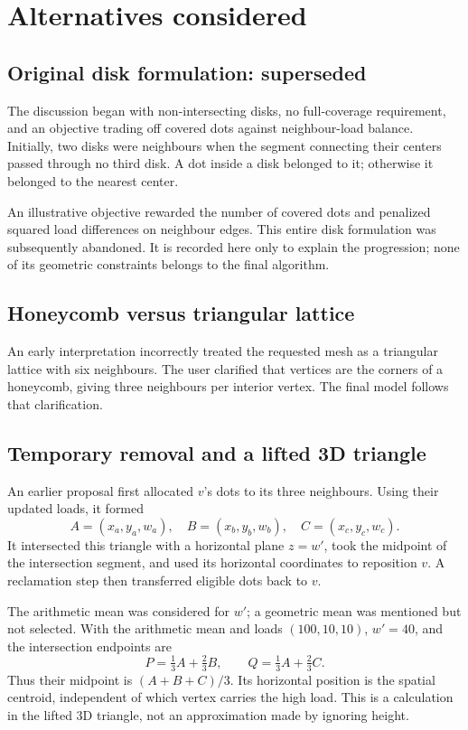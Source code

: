 \documentclass[11pt]{article}
\begin{document}
\section{Alternatives considered}
\subsection{Original disk formulation: superseded}
The discussion began with non-intersecting disks, no full-coverage requirement, and an objective trading off covered dots against neighbour-load balance. Initially, two disks were neighbours when the segment connecting their centers passed through no third disk. A dot inside a disk belonged to it; otherwise it belonged to the nearest center.

An illustrative objective rewarded the number of covered dots and penalized squared load differences on neighbour edges. This entire disk formulation was subsequently abandoned. It is recorded here only to explain the progression; none of its geometric constraints belongs to the final algorithm.

\subsection{Honeycomb versus triangular lattice}
An early interpretation incorrectly treated the requested mesh as a triangular lattice with six neighbours. The user clarified that vertices are the corners of a honeycomb, giving three neighbours per interior vertex. The final model follows that clarification.

\subsection{Temporary removal and a lifted 3D triangle}
An earlier proposal first allocated $v$'s dots to its three neighbours. Using their updated loads, it formed
\[
A=(x_a,y_a,w_a),\quad B=(x_b,y_b,w_b),\quad C=(x_c,y_c,w_c).
\]
It intersected this triangle with a horizontal plane $z=w'$, took the midpoint of the intersection segment, and used its horizontal coordinates to reposition $v$. A reclamation step then transferred eligible dots back to $v$.

The arithmetic mean was considered for $w'$; a geometric mean was mentioned but not selected. With the arithmetic mean and loads $(100,10,10)$, $w'=40$, and the intersection endpoints are
\[
P=\tfrac13 A+\tfrac23 B,\qquad Q=\tfrac13 A+\tfrac23 C.
\]
Thus their midpoint is $(A+B+C)/3$. Its horizontal position is the spatial centroid, independent of which vertex carries the high load. This is a calculation in the lifted 3D triangle, not an approximation made by ignoring height.
\end{document}
